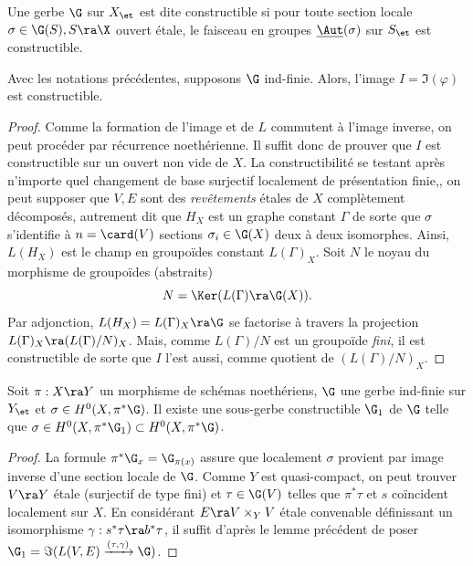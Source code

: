 \documentclass[10pt]{../fichiers-configuration-latex/smfart}
\begin{document}
\begin{definition2} Une gerbe $\G$ sur $X_\et$ est dite constructible si pour toute section locale
$\sigma\in\G(S), S\ra\X$ ouvert étale, le faisceau en groupes $\underline{\Aut}(\sigma)$ sur $S_\et$
est constructible.\end{definition2}


\begin{lemme2} Avec les notations précédentes, supposons $\G$ ind-finie. Alors, l'image
$I=\Im(\varphi)$ est constructible.\end{lemme2}

\begin{proof} Comme la formation de l'image et de $L$ commutent à l'image inverse, on peut procéder
par récurrence noethérienne. Il suffit donc de prouver que $I$ est constructible sur un ouvert non
vide de $X$. La constructibilité se testant après n'importe quel changement de base surjectif
localement de présentation finie,, on peut supposer que $V,E$ sont des
\emph{revêtements} étales de $X$ complètement décomposés, autrement dit que $H_X$ est un graphe
constant $\Gamma$ de sorte que $\sigma$ s'identifie à $n=\card(V)$ sections $\sigma_i\in\G(X)$ deux
à deux isomorphes. Ainsi, $L(H_X)$ est le champ en groupoïdes constant $L(\Gamma)_X$. Soit $N$ le
noyau du morphisme de groupoïdes (abstraits) $$N=\Ker(L(\Gamma)\ra \G(X)).$$ Par adjonction,
$L(H_X)=L(\Gamma)_X\ra \G$ se factorise à travers la projection $L(\Gamma)_X\ra (L(\Gamma)/N)_X$.
Mais, comme $L(\Gamma)/N$ est un groupoïde \emph{fini}, il est constructible de sorte que $I$ l'est
aussi, comme quotient de $(L(\Gamma)/N)_X$.\end{proof}

\begin{proposition2}\label{20prop-constr} Soit $\pi:X\ra Y$ un morphisme de schémas noethériens,
$\G$ une gerbe ind-finie sur $Y_\et$ et $\sigma\in H^0(X,\pi^*\G)$. Il existe  une sous-gerbe
constructible $\G_1$ de $\G$ telle que $\sigma\in H^0(X,\pi^*\G_1)\subset H^0(X,\pi^*\G)$.
\end{proposition2}

\begin{proof} La formule $\pi^*\G_{x}=\G_{\pi(x)}$ assure que localement $\sigma$ provient par image
inverse d'une section locale de $\G$. Comme $Y$ est quasi-compact, on peut trouver $V\ra Y$ étale
(surjectif de type fini) et $\tau\in \G(V)$ telles que $\pi^*\tau$ et $s$ coïncident localement sur
$X$. En considérant $E\ra V\times_YV$ étale convenable définissant un isomorphisme $\gamma:
s^*\tau\ra b^*\tau$, il suffit d'après le lemme précédent de poser
$\G_1=\Im(L(V,E)\xrightarrow{(\tau,\gamma)}\G)$.\end{proof}
\end{document}
